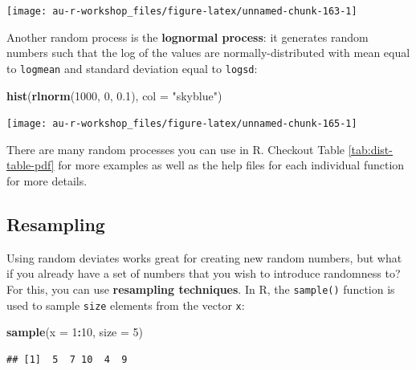 \documentclass[]{book}
\newenvironment{Shaded}{\begin{snugshade}}{\end{snugshade}}
\newcommand{\DataTypeTok}[1]{\textcolor[rgb]{0.13,0.29,0.53}{#1}}
\newcommand{\DecValTok}[1]{\textcolor[rgb]{0.00,0.00,0.81}{#1}}
\newcommand{\FloatTok}[1]{\textcolor[rgb]{0.00,0.00,0.81}{#1}}
\newcommand{\KeywordTok}[1]{\textcolor[rgb]{0.13,0.29,0.53}{\textbf{#1}}}
\newcommand{\NormalTok}[1]{#1}
\newcommand{\OperatorTok}[1]{\textcolor[rgb]{0.81,0.36,0.00}{\textbf{#1}}}
\newcommand{\StringTok}[1]{\textcolor[rgb]{0.31,0.60,0.02}{#1}}
\begin{document}
\begin{center}\texttt{[image: au-r-workshop\_files/figure-latex/unnamed-chunk-163-1]} \end{center}

Another random process is the \textbf{lognormal process}: it generates random numbers such that the log of the values are normally-distributed with mean equal to \texttt{logmean} and standard deviation equal to \texttt{logsd}:

\begin{Shaded}
\begin{Highlighting}[]
\KeywordTok{hist}\NormalTok{(}\KeywordTok{rlnorm}\NormalTok{(}\DecValTok{1000}\NormalTok{, }\DecValTok{0}\NormalTok{, }\FloatTok{0.1}\NormalTok{), }\DataTypeTok{col =} \StringTok{"skyblue"}\NormalTok{)}
\end{Highlighting}
\end{Shaded}

\begin{center}\texttt{[image: au-r-workshop\_files/figure-latex/unnamed-chunk-165-1]} \end{center}

There are many random processes you can use in R. Checkout Table \ref{tab:dist-table-pdf} for more examples as well as the help files for each individual function for more details.

\hypertarget{resampling}{%
\subsection{Resampling}\label{resampling}}

Using random deviates works great for creating new random numbers, but what if you already have a set of numbers that you wish to introduce randomness to? For this, you can use \textbf{resampling techniques}. In R, the \texttt{sample()} function is used to sample \texttt{size} elements from the vector \texttt{x}:

\begin{Shaded}
\begin{Highlighting}[]
\KeywordTok{sample}\NormalTok{(}\DataTypeTok{x =} \DecValTok{1}\OperatorTok{:}\DecValTok{10}\NormalTok{, }\DataTypeTok{size =} \DecValTok{5}\NormalTok{)}
\end{Highlighting}
\end{Shaded}

\begin{verbatim}
## [1]  5  7 10  4  9
\end{verbatim}
\end{document}
